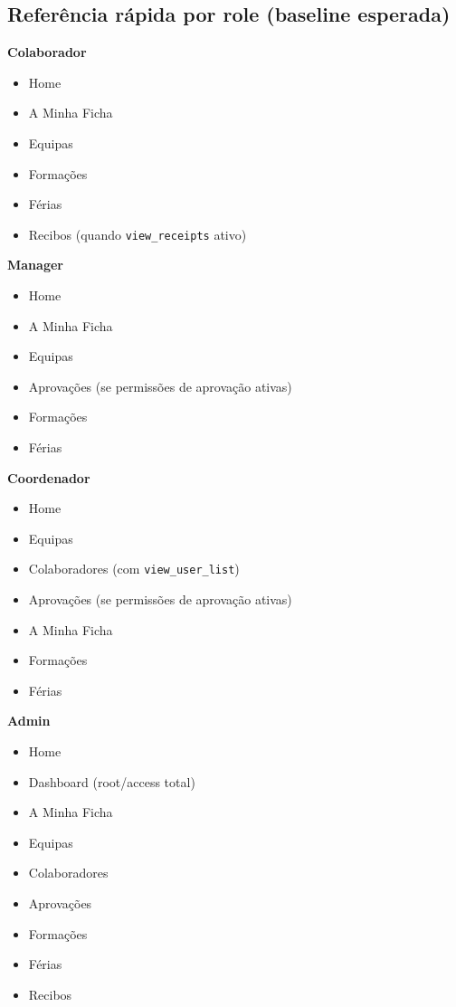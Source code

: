 \documentclass[11pt,a4paper]{article}
\begin{document}
\subsection{Referência rápida por role (baseline esperada)}

\textbf{Colaborador}
\begin{itemize}
  \item Home
  \item A Minha Ficha
  \item Equipas
  \item Formações
  \item Férias
  \item Recibos (quando \texttt{view\_receipts} ativo)
\end{itemize}

\textbf{Manager}
\begin{itemize}
  \item Home
  \item A Minha Ficha
  \item Equipas
  \item Aprovações (se permissões de aprovação ativas)
  \item Formações
  \item Férias
\end{itemize}

\textbf{Coordenador}
\begin{itemize}
  \item Home
  \item Equipas
  \item Colaboradores (com \texttt{view\_user\_list})
  \item Aprovações (se permissões de aprovação ativas)
  \item A Minha Ficha
  \item Formações
  \item Férias
\end{itemize}

\textbf{Admin}
\begin{itemize}
  \item Home
  \item Dashboard (root/access total)
  \item A Minha Ficha
  \item Equipas
  \item Colaboradores
  \item Aprovações
  \item Formações
  \item Férias
  \item Recibos
\end{itemize}
\end{document}
